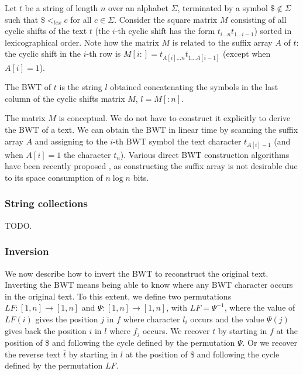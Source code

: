 Let $t$ be a string of length $n$ over an alphabet $\Sigma$, terminated by a symbol $\$ \notin \Sigma$ such that $\$ <_{lex} c$ for all $c \in \Sigma$.
Consider the square matrix $M$ consisting of all cyclic shifts of the text $t$ (the $i$-th cyclic shift has the form $t_{i \dots n} t_{1 \dots i-1}$) sorted in lexicographical order.
Note how the matrix $M$ is related to the suffix array $A$ of $t$: the cyclic shift in the $i$-th row is $M[i:] = t_{A[i] \dots n} t_{1 \dots A[i-1]}$ (except when $A[i] = 1$).

\begin{definition}
The BWT of $t$ is the string $l$ obtained concatenating the symbols in the last column of the cyclic shifts matrix $M$, \ie $l = M[:n]$.
\end{definition}


The matrix $M$ is conceptual. We do not have to construct it explicitly to derive the BWT of a text.
We can obtain the BWT in linear time by scanning the suffix array $A$ and assigning to the $i$-th BWT symbol the text character $t_{A[i]-1}$ (and when $A[i]=1$ the character $t_n$).
Various direct BWT construction algorithms have been recently proposed \citep{Bauer2013, Crochemore2013}, as constructing the suffix array is not desirable due to its space consumption of $n \log{n}$ bits.

\subsubsection{String collections}

TODO.

\subsubsection{Inversion}

We now describe how to invert the BWT to reconstruct the original text.
Inverting the BWT means being able to know where any BWT character occurs in the original text.
To this extent, we define two permutations $LF : [1,n] \rightarrow [1,n]$ and $\Psi : [1,n] \rightarrow [1,n]$, with $LF = \Psi^{-1}$, where the value of $LF(i)$ gives the position $j$ in $f$ where character $l_i$ occurs and the value $\Psi(j)$ gives back the position $i$ in $l$ where $f_j$ occurs.
We recover $t$ by starting in $f$ at the position of \$ and following the cycle defined by the permutation $\Psi$.
Or we recover the reverse text $\bar{t}$ by starting in $l$ at the position of \$ and following the cycle defined by the permutation $LF$.

